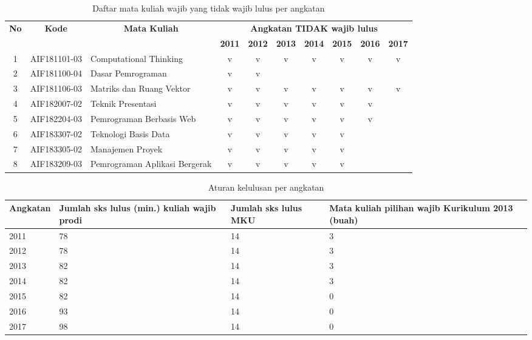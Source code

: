 \begin{table}[H]
\centering
\caption{Daftar mata kuliah wajib yang tidak wajib lulus per angkatan}
\label{tab:2_wajibtidaklulus}
\begin{tabular}{|c|c|p{3.25cm}|c|c|c|c|c|c|c|}
\hline
\multicolumn{1}{|c|}{\multirow{2}{*}{\textbf{No}}} & \multicolumn{1}{c|}{\multirow{2}{*}{\textbf{Kode}}} & \multicolumn{1}{c|}{\multirow{2}{*}{\textbf{Mata Kuliah}}} & \multicolumn{7}{c|}{\textbf{Angkatan TIDAK wajib lulus}} \\ \cline{4-10} 
\multicolumn{1}{|c|}{} & \multicolumn{1}{c|}{} & \multicolumn{1}{c|}{} & \textbf{2011} & \textbf{2012} & \textbf{2013} & \textbf{2014} & \textbf{2015} & \textbf{2016} & \textbf{2017} \\ \hline
1 & AIF181101-03 & Computational Thinking & v & v & v & v & v & v & v \\ \hline
2 & AIF181100-04 & Dasar Pemrograman & v & v &  &  &  &  &  \\ \hline
3 & AIF181106-03 & Matriks dan Ruang Vektor & v & v & v & v & v & v & v \\ \hline
4 & AIF182007-02 & Teknik Presentasi & v & v & v & v & v & v &  \\ \hline
5 & AIF182204-03 & Pemrograman Berbasis Web & v & v & v & v & v & v &  \\ \hline
6 & AIF183307-02 & Teknologi Basis Data & v & v & v & v & v &  &  \\ \hline
7 & AIF183305-02 & Manajemen Proyek & v & v & v & v & v &  &  \\ \hline
8 & AIF183209-03 & Pemrograman Aplikasi Bergerak & v & v & v & v & v &  &  \\ \hline
\end{tabular}
\end{table}

\begin{table}[H]
\centering
\caption{Aturan kelulusan per angkatan}
\label{tab:AturanKelulusan}
\begin{tabular}{|p{2.5cm}|p{3.5cm}|p{3.5cm}|p{3.5cm}|}
\hline
\textbf{Angkatan} & \textbf{Jumlah sks lulus (min.) kuliah wajib prodi} & \textbf{Jumlah sks lulus MKU} & \textbf{Mata kuliah pilihan wajib Kurikulum 2013 (buah)} \\ \hline
2011 & 78 & 14 & 3 \\ \hline
2012 & 78 & 14 & 3 \\ \hline
2013 & 82 & 14 & 3 \\ \hline
2014 & 82 & 14 & 3 \\ \hline
2015 & 82 & 14 & 0 \\ \hline
2016 & 93 & 14 & 0 \\ \hline
2017 & 98 & 14 & 0 \\ \hline
\end{tabular}
\end{table}

